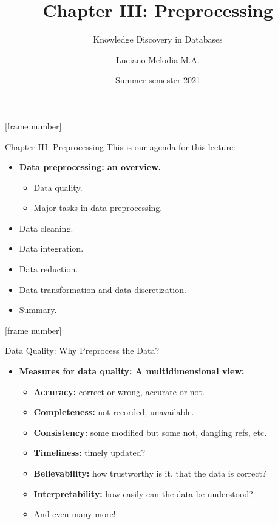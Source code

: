 \documentclass[aspectratio=169,t]{beamer}
\title[KDD]{Chapter III: Preprocessing}
\subtitle{Knowledge Discovery in Databases}
\author[L.~Melodia]{Luciano Melodia M.A.}
\institute[Department]{Evolutionary Data Management, Friedrich-Alexander University Erlangen-Nürnberg}
\date{Summer semester 2021}
\begin{document}
  \maketitle

  {
    [frame number]
    \begin{frame}{Chapter III: Preprocessing}
    This is our agenda for this lecture:
        \begin{itemize}
            \item \textbf{Data preprocessing: an overview.}
            \begin{itemize}
              \item Data quality.
              \item Major tasks in data preprocessing.
            \end{itemize}
            \item Data cleaning.
            \item Data integration.
            \item Data reduction.
            \item Data transformation and data discretization.
            \item Summary.
        \end{itemize}
    \end{frame}
  }

  {
    [frame number]
    \begin{frame}{Data Quality: Why Preprocess the Data?}
        \begin{itemize}
            \item \textbf{Measures for {\color{airforceblue}data quality}: A multidimensional view:}
            \begin{itemize}
              \item \textbf{Accuracy:} correct or wrong, accurate or not.
              \item \textbf{Completeness:} not recorded, unavailable.
              \item \textbf{Consistency:} some modified but some not, dangling refs, etc.
              \item \textbf{Timeliness:} timely updated?
              \item \textbf{Believability:} how trustworthy is it, that the data is correct?
              \item \textbf{Interpretability:} how easily can the data be understood?
              \item And even many more!
            \end{itemize}
        \end{itemize}
    \end{frame}
  }
\end{document}
